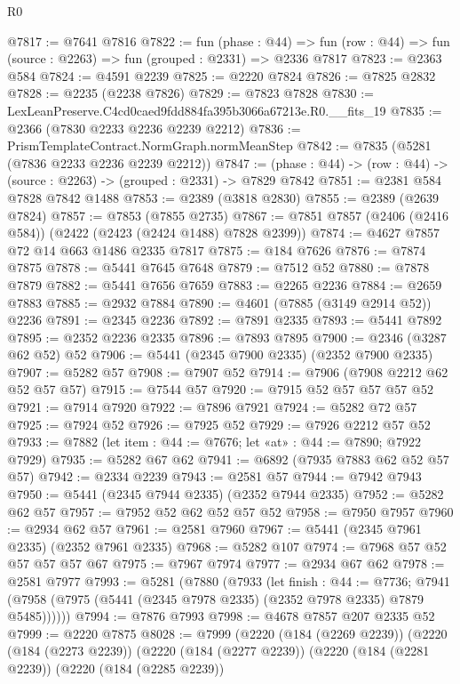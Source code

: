 \begin{lexlean}{R0}
\begin{coremodule}
@7817 := @7641 @7816
@7822 := fun (phase : @44) =>
  fun (row : @44) => fun (source : @2263) => fun (grouped : @2331) => @2336 @7817
@7823 := @2363 @584
@7824 := @4591 @2239
@7825 := @2220 @7824
@7826 := @7825 @2832
@7828 := @2235 (@2238 @7826)
@7829 := @7823 @7828
@7830 := LexLeanPreserve.C4cd0caed9fdd884fa395b3066a67213e.R0.__fits_19
@7835 := @2366 (@7830 @2233 @2236 @2239 @2212)
@7836 := PrismTemplateContract.NormGraph.normMeanStep
@7842 := @7835 (@5281 (@7836 @2233 @2236 @2239 @2212))
@7847 := (phase : @44) -> (row : @44) -> (source : @2263) -> (grouped : @2331) -> @7829 @7842
@7851 := @2381 @584 @7828 @7842 @1488
@7853 := @2389 (@3818 @2830)
@7855 := @2389 (@2639 @7824)
@7857 := @7853 (@7855 @2735)
@7867 := @7851 @7857 (@2406 (@2416 @584)) (@2422 (@2423 (@2424 @1488) @7828 @2399))
@7874 := @4627 @7857 @72 @14 @663 @1486 @2335 @7817
@7875 := @184 @7626
@7876 := @7874 @7875
@7878 := @5441 @7645 @7648
@7879 := @7512 @52
@7880 := @7878 @7879
@7882 := @5441 @7656 @7659
@7883 := @2265 @2236
@7884 := @2659 @7883
@7885 := @2932 @7884
@7890 := @4601 (@7885 (@3149 @2914 @52)) @2236
@7891 := @2345 @2236
@7892 := @7891 @2335
@7893 := @5441 @7892
@7895 := @2352 @2236 @2335
@7896 := @7893 @7895
@7900 := @2346 (@3287 @62 @52) @52
@7906 := @5441 (@2345 @7900 @2335) (@2352 @7900 @2335)
@7907 := @5282 @57
@7908 := @7907 @52
@7914 := @7906 (@7908 @2212 @62 @52 @57 @57)
@7915 := @7544 @57
@7920 := @7915 @52 @57 @57 @57 @52
@7921 := @7914 @7920
@7922 := @7896 @7921
@7924 := @5282 @72 @57
@7925 := @7924 @52
@7926 := @7925 @52
@7929 := @7926 @2212 @57 @52
@7933 := @7882 (let item : @44 := @7676; let «at» : @44 := @7890; @7922 @7929)
@7935 := @5282 @67 @62
@7941 := @6892 (@7935 @7883 @62 @52 @57 @57)
@7942 := @2334 @2239
@7943 := @2581 @57
@7944 := @7942 @7943
@7950 := @5441 (@2345 @7944 @2335) (@2352 @7944 @2335)
@7952 := @5282 @62 @57
@7957 := @7952 @52 @62 @52 @57 @52
@7958 := @7950 @7957
@7960 := @2934 @62 @57
@7961 := @2581 @7960
@7967 := @5441 (@2345 @7961 @2335) (@2352 @7961 @2335)
@7968 := @5282 @107
@7974 := @7968 @57 @52 @57 @57 @57 @67
@7975 := @7967 @7974
@7977 := @2934 @67 @62
@7978 := @2581 @7977
@7993 := @5281
    (@7880
      (@7933
        (let finish : @44 := @7736;
        @7941 (@7958 (@7975 (@5441 (@2345 @7978 @2335) (@2352 @7978 @2335) @7879 @5485))))))
@7994 := @7876 @7993
@7998 := @4678 @7857 @207 @2335 @52
@7999 := @2220 @7875
@8028 := @7999
    (@2220
      (@184 (@2269 @2239))
      (@2220
        (@184 (@2273 @2239))
        (@2220
          (@184 (@2277 @2239))
          (@2220
            (@184 (@2281 @2239))
            (@2220
              (@184 (@2285 @2239))

\end{coremodule}
\end{lexlean}
